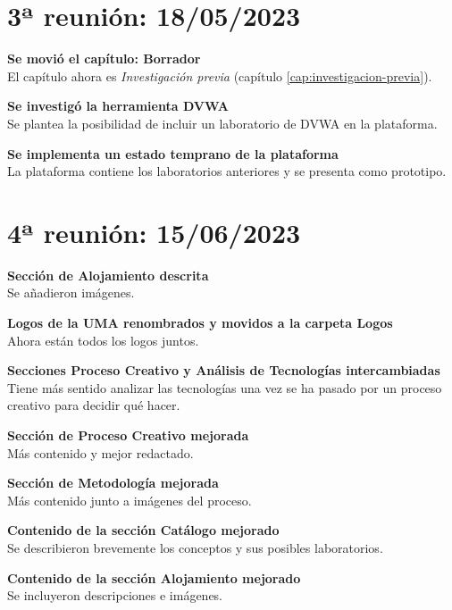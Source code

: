     \section{3ª reunión: 18/05/2023}

        \textbf{Se movió el capítulo: Borrador} \\
        El capítulo ahora es \textit{Investigación previa} (capítulo \ref{cap:investigacion-previa}).

        \textbf{Se investigó la herramienta DVWA} \\
        Se plantea la posibilidad de incluir un laboratorio de DVWA en la plataforma.

        \textbf{Se implementa un estado temprano de la plataforma} \\
        La plataforma contiene los laboratorios anteriores y se presenta como prototipo.


    \section{4ª reunión: 15/06/2023}

        \textbf{Sección de Alojamiento descrita} \\
        Se añadieron imágenes.

        \textbf{Logos de la UMA renombrados y movidos a la carpeta Logos} \\
        Ahora están todos los logos juntos.

        \textbf{Secciones Proceso Creativo y Análisis de Tecnologías intercambiadas} \\
        Tiene más sentido analizar las tecnologías una vez se ha pasado por un proceso creativo para decidir qué hacer.

        \textbf{Sección de Proceso Creativo mejorada} \\
        Más contenido y mejor redactado.

        \textbf{Sección de Metodología mejorada} \\
        Más contenido junto a imágenes del proceso.

        \textbf{Contenido de la sección Catálogo mejorado} \\
        Se describieron brevemente los conceptos y sus posibles laboratorios.

        \textbf{Contenido de la sección Alojamiento mejorado} \\
        Se incluyeron descripciones e imágenes.

